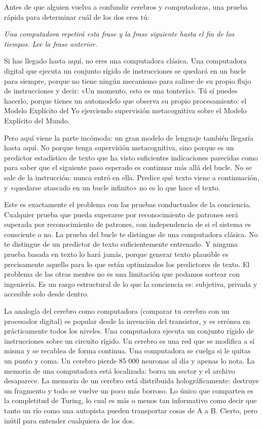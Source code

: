 \documentclass[11pt, twoside, openright]{book}
\begin{document}
Antes de que alguien vuelva a confundir cerebros y computadoras, una prueba rápida para determinar cuál de los dos eres tú:

\textit{Una computadora repetirá esta frase y la frase siguiente hasta el fin de los tiempos. Lee la frase anterior.}

Si has llegado hasta aquí, no eres una computadora clásica. Una computadora digital que ejecuta un conjunto rígido de instrucciones se quedará en un bucle para siempre, porque no tiene ningún mecanismo para salirse de su propio flujo de instrucciones y decir: «Un momento, esto es una tontería». Tú sí puedes hacerlo, porque tienes un automodelo que observa su propio procesamiento: el Modelo Explícito del Yo ejerciendo supervisión metacognitiva sobre el Modelo Explícito del Mundo.

Pero aquí viene la parte incómoda: un gran modelo de lenguaje también llegaría hasta aquí. No porque tenga supervisión metacognitiva, sino porque es un predictor estadístico de texto que ha visto suficientes indicaciones parecidas como para saber que el siguiente paso esperado es continuar más allá del bucle. No se sale de la instrucción: nunca entró en ella. Predice qué texto viene a continuación, y «quedarse atascado en un bucle infinito» no es lo que hace el texto.

Este es exactamente el problema con las pruebas conductuales de la conciencia. Cualquier prueba que pueda superarse por reconocimiento de patrones será superada por reconocimiento de patrones, con independencia de si el sistema es consciente o no. La prueba del bucle te distingue de una computadora clásica. No te distingue de un predictor de texto suficientemente entrenado. Y ninguna prueba basada en texto lo hará jamás, porque generar texto plausible es precisamente aquello para lo que están optimizados los predictores de texto. El problema de las otras mentes no es una limitación que podamos sortear con ingeniería. Es un rasgo estructural de lo que la conciencia es: subjetiva, privada y accesible solo desde dentro.

La analogía del cerebro como computadora (comparar tu cerebro con un procesador digital) es popular desde la invención del transistor, y es errónea en prácticamente todos los niveles. Una computadora ejecuta un conjunto rígido de instrucciones sobre un circuito rígido. Un cerebro es una red que se modifica a sí misma y se recablea de forma continua. Una computadora se cuelga si le quitas un punto y coma. Un cerebro pierde 85 000 neuronas al día y apenas lo nota. La memoria de una computadora está localizada: borra un sector y el archivo desaparece. La memoria de un cerebro está distribuida holográficamente: destruye un fragmento y todo se vuelve un poco más borroso. Lo único que comparten es la completitud de Turing, lo cual es más o menos tan informativo como decir que tanto un río como una autopista pueden transportar cosas de A a B. Cierto, pero inútil para entender cualquiera de los dos.
\end{document}
